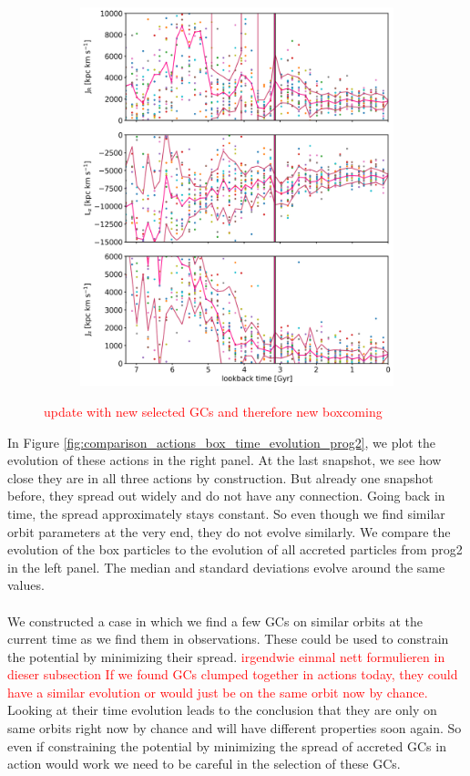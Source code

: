 \begin{figure}[htbp]
\begin{subfigure}[c]{0.48\textwidth}
	    \includegraphics[width=\textwidth]{plots/Dynamics/prog2/gcwodisk_action_time_evolution_box_hist_mean.png}
    \end{subfigure}
    \caption{\textcolor{red}{update with new selected GCs and therefore new boxcoming}}\label{fig:comparison_actions_time_evolution_box_prog2}
\end{figure}
In Figure \ref{fig:comparison_actions_box_time_evolution_prog2}, we plot the evolution of these actions in the right panel. At the last snapshot, we see how close they are in all three actions by construction. But already one snapshot before, they spread out widely and do not have any connection. Going back in time, the spread approximately stays constant. So even though we find similar orbit parameters at the very end, they do not evolve similarly. We compare the evolution of the box particles to the evolution of all accreted particles from prog2 in the left panel. The median and standard deviations evolve around the same values. \\\\
We constructed a case in which we find a few \acp{GC} on similar orbits at the current time as we find them in observations. These could be used to constrain the potential by minimizing their spread. \textcolor{red}{ irgendwie einmal nett formulieren in dieser subsection If we found \acp{GC} clumped together in actions today, they could have a similar evolution or would just be on the same orbit now by chance. }Looking at their time evolution leads to the conclusion that they are only on same orbits right now by chance and will have different properties soon again. So even if constraining the potential by minimizing the spread of accreted \acp{GC} in action would work we need to be careful in the selection of these \acp{GC}.
